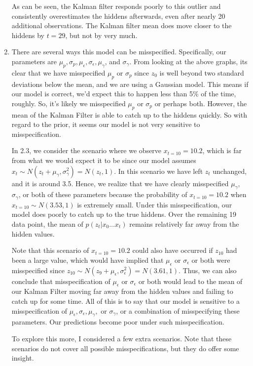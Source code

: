 \documentclass[submit]{harvardml}
\begin{document}
\begin{enumerate}
As can be seen, the Kalman filter responds poorly to this outlier and consistently overestimates the hiddens afterwards, even after nearly 20 additional observations. The Kalman filter mean does move closer to the hiddens by $t=29$, but not by very much.

\item There are several ways this model can be misspecified. Specifically, our parameters are $\mu_p, \sigma_p, \mu_\epsilon, \sigma_\epsilon, \mu_\gamma$, and $\sigma_\gamma$. From looking at the above graphs, its clear that we have misspecified $\mu_p$ or $\sigma_p$ since $z_0$ is well beyond two standard deviations below the mean, and we are using a Gaussian model. This means if our model is correct, we'd expect this to happen less than 5\% of the time, roughly. So, it's likely we misspecified $\mu_p$ or $\sigma_p$ or perhaps both. However, the mean of the Kalman Filter is able to catch up to the hiddens quickly. So with regard to the prior, it seems our model is not very sensitive to misspecification.

In 2.3, we consider the scenario where we observe $x_{t=10}= 10.2$, which is far from what we would expect it to be since our model assumes $x_t \sim N(z_t + \mu_\gamma, \sigma^2_\gamma) = N(z_t, 1)$. In this scenario we have left $z_t$ unchanged, and it is around 3.5. Hence, we realize that we have clearly misspecified $\mu_\gamma$, $\sigma_\gamma$, or both of these parameters because the probability of $x_{t=10}= 10.2$ when $x_{t=10} \sim N(3.53,1)$ is extremely small. Under this misspecification, our model does poorly to catch up to the true hiddens. Over the remaining 19 data point, the mean of $p(z_t|x_0 \dots x_t)$ remains relatively far away from the hidden values. 

Note that this scenario of $x_{t=10}= 10.2$ could also have occurred if $z_{10}$ had been a large value, which would have implied that $\mu_\epsilon$ or $\sigma_\epsilon$ or both were misspecified since $z_{10} \sim N(z_9 + \mu_\epsilon, \sigma^2_\epsilon) = N(3.61, 1)$. Thus, we can also conclude that misspecification of $\mu_\epsilon$ or $\sigma_\epsilon$ or both would lead to the mean of our Kalman Filter moving far away from the hidden values and failing to catch up for some time. All of this is to say that our model is sensitive to a misspecification of $\mu_\epsilon, \sigma_\epsilon, \mu_\gamma,$ or $\sigma_\gamma$, or a combination of misspecifying these parameters. Our predictions become poor under such misspecification.

To explore this more, I considered a few extra scenarios. Note that these scenarios do not cover all possible misspecifications, but they do offer some insight. 


\end{enumerate}
\end{document}
